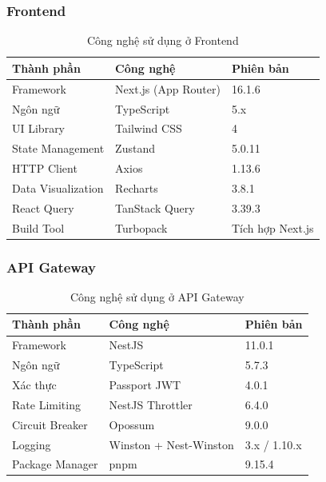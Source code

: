 \documentclass[12pt,a4paper]{report}
\begin{document}
\subsubsection{Frontend}
\begin{table}[H]
\centering
\caption{Công nghệ sử dụng ở Frontend}
\label{tab:frontend_tech}
\begin{tabularx}{\textwidth}{|l|X|l|}
\hline
\rowcolor{gray!10}
Thành phần & Công nghệ & Phiên bản \\ \hline
Framework & Next.js (App Router) & 16.1.6 \\ \hline
Ngôn ngữ & TypeScript & 5.x \\ \hline
UI Library & Tailwind CSS & 4 \\ \hline
State Management & Zustand & 5.0.11 \\ \hline
HTTP Client & Axios & 1.13.6 \\ \hline
Data Visualization & Recharts & 3.8.1 \\ \hline
React Query & TanStack Query & 3.39.3 \\ \hline
Build Tool & Turbopack & Tích hợp Next.js \\ \hline
\end{tabularx}
\end{table}

\subsubsection{API Gateway}
\begin{table}[H]
\centering
\caption{Công nghệ sử dụng ở API Gateway}
\label{tab:gateway_tech}
\begin{tabularx}{\textwidth}{|l|X|l|}
\hline
\rowcolor{gray!10}
Thành phần & Công nghệ & Phiên bản \\ \hline
Framework & NestJS & 11.0.1 \\ \hline
Ngôn ngữ & TypeScript & 5.7.3 \\ \hline
Xác thực & Passport JWT & 4.0.1 \\ \hline
Rate Limiting & NestJS Throttler & 6.4.0 \\ \hline
Circuit Breaker & Opossum & 9.0.0 \\ \hline
Logging & Winston + Nest-Winston & 3.x / 1.10.x \\ \hline
Package Manager & pnpm & 9.15.4 \\ \hline
\end{tabularx}
\end{table}
\end{document}

